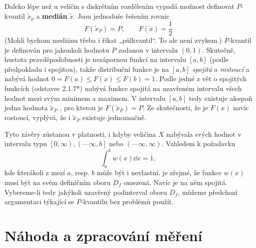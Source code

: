       Daleko lépe než u veličin s diskrétním rozdělením vypadá možnost definovat \(P\)-kvantil 
      \(\tilde{x}_p\) a \textbf{medián} \(\tilde{x}\). Jsou jednoduše řešením rovnic
      \begin{equation*}
        F(\tilde{x}_P) = P, \qquad F(\tilde{x}) = \dfrac{1}{2}
      \end{equation*}
      (Mohli bychom mediánu třeba i říkat „půlkvantil“. To ale není zvykem.) \(P\)-kvantil je 
      definován pro jakoukoli hodnotu \(P\) zadanou v intervalu \((0, 1)\). Skutečně, hustota 
      pravděpodobnosti je nezápornou funkcí na intervalu \([a, b]\) (podle předpokladu i spojitou), 
      takže distribuční funkce je na \([a, b]\) \emph{spojitá} a \emph{rostoucí} a nabývá hodnot 
      \(0 = F(a) \leq F(x) \leq F(b) = 1\). Podle jedné z vět o spojitých funkcích (odstavec 
      2.1.7*) nabývá funkce spojitá na uzavřeném intervalu všech hodnot mezi svým minimem a 
      maximem. V intervalu \([a, b]\) tedy existuje alespoň jedna hodnota \(\tilde{x}_P\) , pro 
      kterou je \(F(\tilde{x}_P) = P\). Ze skutečnosti, že je \(F(x)\) navíc rostoucí, vyplývá, že 
      i \(\tilde{x}_P\) existuje jednoznačně.
  
      Tyto závěry zůstanou v platnosti, i kdyby veličina \(X\) nabývala svých hodnot v intervalu
      typu \(\left[0, \infty\right), \left(—\infty, b\right]\) nebo \((—\infty, \infty)\). Vzhledem 
      k požadavku
      \begin{equation*}
        \int_{a}^{b}w(x)\dd{x} = 1,
      \end{equation*}
      kde kterákoli z mezí \(a\), resp. \(b\) může být i nevlastní, je zřejmé, že funkce \(w(x)\) 
      musí být na svém definičním oboru \(D_f\) omezená. Navíc je na něm spojitá. Vybereme-li tedy 
      jakýkoli uzavřený podinterval oboru \(D_f\), můžeme předchozí argumentaci týkající se 
      \(P\)-kvantilu bez problémů použít.

      
  
      
  
  \section{Náhoda a zpracování měření}\label{mai:IchapIIIsecIV}
